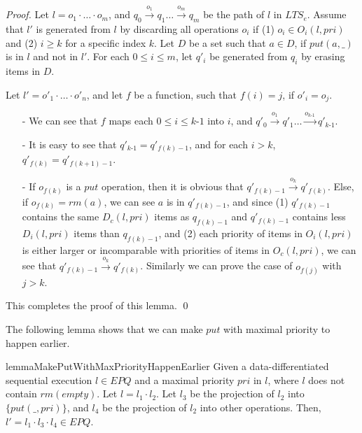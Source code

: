 \begin {proof}
Let $l=o_1 \cdot \ldots \cdot o_m$, and $q_0 \xrightarrow{o_1} q_1 \ldots \xrightarrow{o_m} q_m$ be the path of $l$ in $\textit{LTS}_e$. Assume that $l'$ is generated from $l$ by discarding all operations $o_i$ if (1) $o_i \in O_i(l,\textit{pri})$ and (2) $i \geq k$ for a specific index $k$. Let $D$ be a set such that $a \in D$, if $\textit{put}(a,\_)$ is in $l$ and not in $l'$. For each $0 \leq i \leq m$, let $q'_i$ be generated from $q_i$ by erasing items in $D$.

Let $l'=o'_1 \cdot \ldots \cdot o'_n$, and let $f$ be a function, such that $f(i)=j$, if $o'_i = o_j$.

\begin{itemize}
\setlength{\itemsep}{0.5pt}
\item[-] We can see that $f$ maps each $0 \leq i \leq \textit{k-1}$ into $i$, and $q'_0 \xrightarrow{o_1} q'_1 \ldots \xrightarrow{o_{\textit{k-1}}} q'_{\textit{k-1}}$.

\item[-] It is easy to see that $q'_{\textit{k-1}} = q'_{f(k)-1}$, and for each $i>k$, $q'_{f(k)} = q'_{f(k+1)-1}$.

\item[-] If $o_{f(k)}$ is a $\textit{put}$ operation, then it is obvious that $q'_{f(k)-1} \xrightarrow{o_k} q'_{f(k)}$. Else, if $o_{f(k)} = \textit{rm}(a)$, we can see $a$ is in $q'_{f(k)-1}$, and since (1) $q'_{f(k)-1}$ contains the same $D_c(l,\textit{pri})$ items as $q_{f(k)-1}$ and $q'_{f(k)-1}$ contains less $D_i(l,\textit{pri})$ items than $q_{f(k)-1}$, and (2) each priority of items in $O_i(l,\textit{pri})$ is either larger or incomparable with priorities of items in  $O_c(l,\textit{pri})$, we can see that $q'_{f(k)-1} \xrightarrow{o_k} q'_{f(k)}$. Similarly we can prove the case of $o_{f(j)}$ with $j > k$.
\end{itemize}

This completes the proof of this lemma. \qed
\end {proof}

The following lemma shows that we can make $\textit{put}$ with maximal priority to happen earlier.

\begin{restatable}{lemma}{MakePutWithMaxPriorityHappenEarlier}
\label{lemma:make put with maximal priority happen earlier}
Given a data-differentiated sequential execution $l \in \textit{EPQ}$ and a maximal priority $\textit{pri}$ in $l$, where $l$ does not contain $\textit{rm}(\textit{empty})$. Let $l=l_1 \cdot l_2$. Let $l_3$ be the projection of $l_2$ into $\{ \textit{put}(\_,\textit{pri}) \}$, and $l_4$ be the projection of $l_2$ into other operations. Then, $l'=l_1 \cdot l_3 \cdot l_4 \in \textit{EPQ}$.
\end{restatable}

